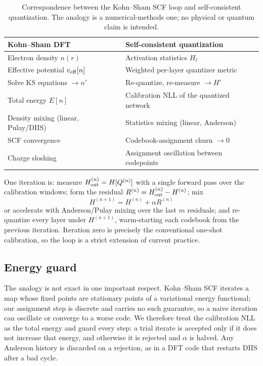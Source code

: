 \begin{table}[ht]
\centering\small
\caption{Correspondence between the Kohn--Sham SCF loop and self-consistent
quantization. The analogy is a numerical-methods one; no physical or quantum
claim is intended.}
\label{tab:dft}
\begin{tabular}{ll}\toprule
Kohn--Sham DFT & Self-consistent quantization\\\midrule
Electron density $n(r)$ & Activation statistics $H_\ell$\\
Effective potential $v_{\rm eff}[n]$ & Weighted per-layer quantizer metric\\
Solve KS equations $\to n'$ & Re-quantize, re-measure $\to H'$\\
Total energy $E[n]$ & Calibration NLL of the quantized network\\
Density mixing (linear, Pulay/DIIS) & Statistics mixing (linear, Anderson)\\
SCF convergence & Codebook-assignment churn $\to0$\\
Charge sloshing & Assignment oscillation between codepoints\\\bottomrule
\end{tabular}
\end{table}

One iteration is: measure $H^{(n)}_{\rm out}=H[Q^{(n)}]$ with a single forward
pass over the calibration windows; form the residual
$R^{(n)}=H^{(n)}_{\rm out}-H^{(n)}$; mix
\begin{equation}
 H^{(n+1)} = H^{(n)} + \alpha R^{(n)}
\end{equation}
or accelerate with Anderson/Pulay mixing over the last $m$ residuals; and
re-quantize every layer under $H^{(n+1)}$, warm-starting each codebook from the
previous iteration. Iteration zero is precisely the conventional one-shot
calibration, so the loop is a strict extension of current practice.

\subsection{Energy guard}

The analogy is not exact in one important respect. Kohn--Sham SCF iterates a
map whose fixed points are stationary points of a variational energy
functional; our assignment step is discrete and carries no such guarantee, so a
naive iteration can oscillate or converge to a worse code. We therefore treat
the calibration NLL as the total energy and guard every step: a trial iterate
is accepted only if it does not increase that energy, and otherwise it is
rejected and $\alpha$ is halved. Any Anderson history is discarded on a
rejection, as in a DFT code that restarts DIIS after a bad cycle.

